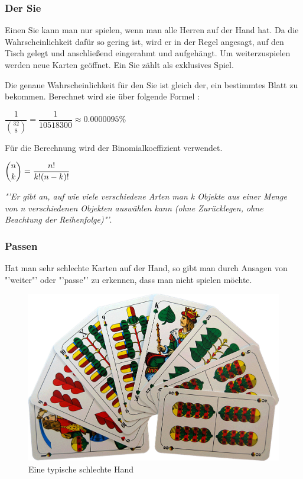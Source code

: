 \documentclass[
							a4paper, 
							11pt, 
							openany, 
							liststotoc,
							parskip=half, 
   							headings=normal
						]{scrreprt}
\begin{document}
{\clearpage

\subsubsection{Der Sie} \label{ssse:grundlagen_schafkopf_regeln_sie}
Einen Sie kann man nur spielen, wenn man alle Herren auf der Hand hat. Da die Wahrscheinlichkeit dafür so gering ist, wird er in der Regel angesagt, auf den Tisch gelegt und anschließend eingerahmt und aufgehängt. Um weiterzuspielen werden neue Karten geöffnet. Ein Sie zählt als exklusives Spiel.

Die genaue Wahrscheinlichkeit für den Sie ist gleich der, ein bestimmtes Blatt zu bekommen. Berechnet wird sie über folgende Formel \cite[S.88]{merschbacher:schafkopf}:

$\dfrac{1}{{32 \choose 8}} = \dfrac{1}{10518300} \approx 0.0000095\%$

Für die Berechnung wird der Binomialkoeffizient verwendet. 

$\dbinom{n}{k} = \dfrac{n!}{k!{(n - k)}!}$

\textit{"'Er gibt an, auf wie viele verschiedene Arten man k Objekte aus einer Menge von n verschiedenen Objekten auswählen kann (ohne Zurücklegen, ohne Beachtung der Reihenfolge)"'}\cite{wiki:binomialkoeffizient}.

\clearpage

\subsubsection{Passen} \label{ssse:grundlagen_schafkopf_regeln_passen}
Hat man sehr schlechte Karten auf der Hand, so gibt man durch Ansagen von "'weiter"' oder "'passe"' zu erkennen, dass man nicht spielen möchte.

\begin{figure}[H]
\begin{center}
    \includegraphics[width=1.0\textwidth]{./pictures/cards/nix.jpg}
	\caption[Schafkopf -- Eine typische schlechte Hand]{Eine typische schlechte Hand} \label{fig:schafkopf_karten_nix}
\end{center}
\end{figure}

}
\end{document}
